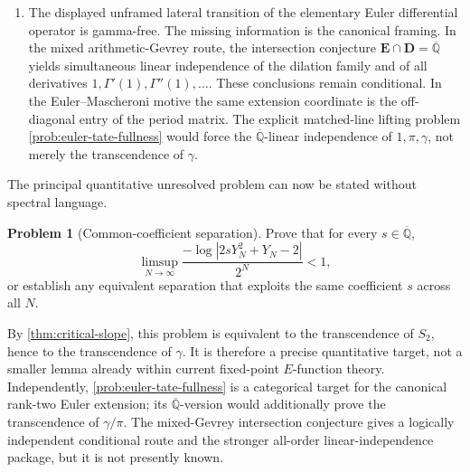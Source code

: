 \documentclass[11pt]{article}
\theoremstyle{definition}
\newtheorem{problem}[theorem]{Problem}
\theoremstyle{remark}
\newcommand{\Qbar}{\overline{\mathbb Q}}
\begin{document}
\begin{enumerate}[label=\textup{(\arabic*)}]
 exact logarithmic linear forms, positivity, and the endpoint factor
 \(p^{(1-\theta)n}\).  Even after the whole factor is favorably credited as
 fixed-place gain, the universal saddle-cancellation inequality shows that
 this ledger does not improve the Pr\'evost baseline.  Balanced factorial
 ratios themselves have only \(O(\log n)\) fixed-prime valuation.
 \item The displayed unframed lateral transition of the elementary Euler
 differential operator is gamma-free.  The missing information is the
 canonical framing.  In the mixed arithmetic-Gevrey route, the intersection
 conjecture \(\mathbf E\cap\mathbf D=\Qbar\) yields simultaneous linear
 independence of the dilation family and of all derivatives
 \(1,\Gamma'(1),\Gamma''(1),\ldots\).  These conclusions remain
 conditional.  In the Euler--Mascheroni motive the same extension
 coordinate is the off-diagonal entry of the period matrix.  The explicit
 matched-line lifting problem \cref{prob:euler-tate-fullness} would force
 the \(\Qbar\)-linear independence of \(1,\pi,\gamma\), not merely the
 transcendence of \(\gamma\).
\end{enumerate}

The principal quantitative unresolved problem can now be stated without
spectral language.

\begin{problem}[Common-coefficient separation]
\label{prob:common-coefficient}
Prove that for every \(s\in\Qbar\),
\[
 \limsup_{N\to\infty}
 \frac{-\log|2sY_N^2+Y_N-2|}{2^N}<1,
\]
or establish any equivalent separation that exploits the same coefficient
\(s\) across all \(N\).
\end{problem}

By \cref{thm:critical-slope}, this problem is equivalent to the
transcendence of \(S_2\), hence to the transcendence of \(\gamma\).  It is
therefore a precise quantitative target, not a smaller lemma already within
current fixed-point \(E\)-function theory.  Independently,
\cref{prob:euler-tate-fullness} is a categorical target for the canonical
rank-two Euler extension; its \(\Qbar\)-version would additionally prove
the transcendence of \(\gamma/\pi\).  The mixed-Gevrey intersection
conjecture gives a logically independent conditional route and the stronger
all-order linear-independence package, but it is not presently known.
\end{document}
